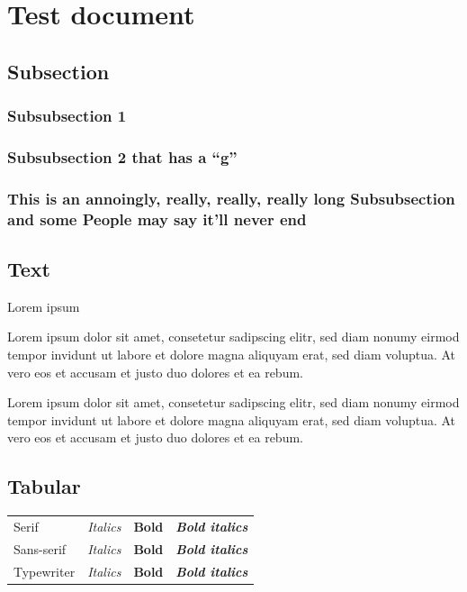 
\section{Test document}\label{sec:test-document}


\subsection{Subsection}
\subsubsection{Subsubsection 1}
\subsubsection{Subsubsection 2 that has a ``g''}
\subsubsection{This is an annoingly, really, really, really long Subsubsection and some People may say it'll never end}


\subsection{Text}

Lorem ipsum

Lorem ipsum dolor sit amet, consetetur sadipscing elitr, sed diam nonumy eirmod tempor invidunt ut labore et dolore magna aliquyam erat, sed diam voluptua. At vero eos et accusam et justo duo dolores et ea rebum.

{\sffamily Lorem ipsum dolor sit amet, consetetur sadipscing elitr, sed diam nonumy eirmod tempor invidunt ut labore et dolore magna aliquyam erat, sed diam voluptua. At vero eos et accusam et justo duo dolores et ea rebum.}


\subsection{Tabular}

\begin{tabular}{llll}
    \rmfamily Serif & \rmfamily\itshape Italics
    & \rmfamily\bfseries Bold & \rmfamily\itshape\bfseries Bold italics
    \\
    \sffamily Sans-serif & \sffamily\itshape Italics
    & \sffamily\bfseries Bold & \sffamily\itshape\bfseries Bold italics
    \\
    \ttfamily Typewriter & \ttfamily\itshape Italics
    & \ttfamily\bfseries Bold & \ttfamily\itshape\bfseries Bold italics
\end{tabular}


